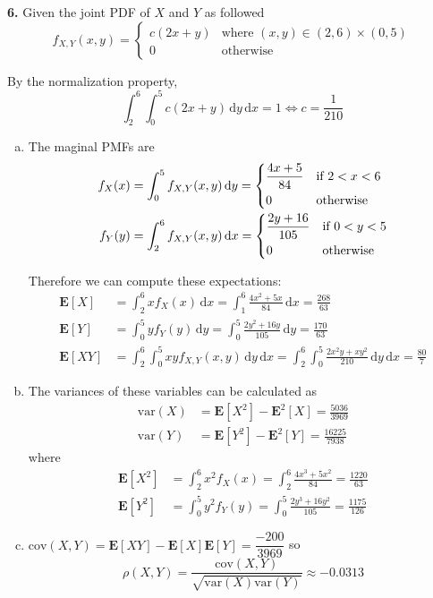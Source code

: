 \documentclass[a4paper,12pt]{article}
\newcommand{\E}{\mathbf E}
\newcommand{\ud}{\,\mathrm{d}}
\newcommand{\var}{\mathrm{var}}
\newcommand{\cov}{\mathrm{cov}}
\newcommand{\exercise}[1]{\noindent\textbf{#1.}}
\begin{document}
\exercise 6  Given the joint PDF of $X$ and $Y$ as followed
\[f_{X,Y}(x, y) = \begin{cases}
  c(2x + y) &\text{where }(x, y) \in (2, 6) \times (0, 5)\\
  0 &\text{otherwise}
\end{cases}\]

By the normalization property,
\[\int_2^6\int_0^5 c(2x + y)\ud y\ud x = 1 \iff c = \frac{1}{210}\]
\begin{enumerate}[(a)]
  \item The maginal PMFs are
    \begin{align*}
      f_X(x) &= \int_0^5 f_{X,Y}(x, y)\ud y = \begin{dcases}
        \frac{4x + 5}{84} &\text{if }2 < x < 6\\
        0 &\text{otherwise}
      \end{dcases}\\
      f_Y(y) &= \int_2^6 f_{X,Y}(x, y)\ud x = \begin{dcases}
        \frac{2y + 16}{105} &\text{if }0 < y < 5\\
        0 &\text{otherwise}
      \end{dcases}
    \end{align*}

    Therefore we can compute these expectations:
    \begin{align*}
      \E[X] &= \int_2^6 x f_X(x)\ud x
      = \int_1^6\frac{4x^2 + 5x}{84}\ud x = \frac{268}{63}\\
      \E[Y] &= \int_0^5 y f_Y(y)\ud y
      = \int_0^5\frac{2y^2 + 16y}{105}\ud y = \frac{170}{63}\\
      \E[XY] &= \int_2^6\int_0^5 xy f_{X,Y}(x,y)\ud y\ud x
      = \int_2^6\int_0^5\frac{2x^2 y + xy^2}{210}\ud y\ud x = \frac{80}{7}
    \end{align*}
  \item The variances of these variables can be calculated as
    \begin{align*}
      \var(X) &= \E\left[X^2\right] - \E^2[X] = \frac{5036}{3969}\\
      \var(Y) &= \E\left[Y^2\right] - \E^2[Y] = \frac{16225}{7938}
    \end{align*}
    where
    \begin{align*}
      \E\left[X^2\right] &= \int_2^6 x^2 f_X(x)
      = \int_2^6\frac{4x^3 + 5x^2}{84} = \frac{1220}{63}\\
      \E\left[Y^2\right] &= \int_0^5 y^2 f_Y(y)
      = \int_0^5\frac{2y^3 + 16y^2}{105} = \frac{1175}{126}
    \end{align*}
  \item $\cov(X, Y) = \E[XY] - \E[X]\E[Y] = \dfrac{-200}{3969}$ so
    \[\rho(X, Y) = \dfrac{\cov(X, Y)}{\sqrt{\var(X)\var(Y)}} \approx -0.0313\]
\end{enumerate}
\end{document}
